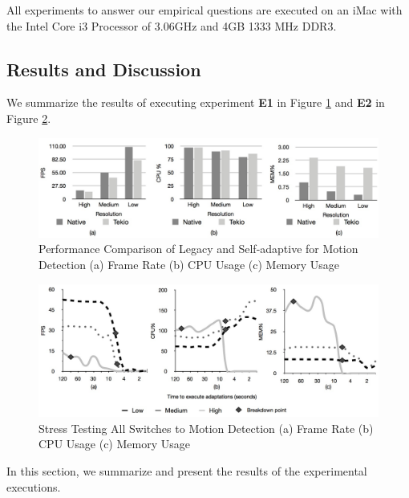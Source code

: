 \documentclass{acm_proc_article-sp}
\begin{document}
All experiments to answer our empirical questions  are executed on an iMac with the Intel Core i3 Processor of 3.06GHz and 4GB 1333 MHz DDR3.
	
\subsection{Results and Discussion}
\label{sec:sec:resultsdiscussion}

We summarize the results of executing experiment \textbf{E1} in Figure \ref{fig:performanceComparison} and  \textbf{E2} in Figure \ref{fig:stressTesting}.
	\begin{figure}
	\centering %
		\includegraphics[scale=0.55]{images/MotionDetectionComparison.jpg} 
		\caption{Performance Comparison of Legacy and Self-adaptive for Motion Detection (a) Frame Rate (b) CPU Usage (c) Memory Usage }
		 \label{fig:performanceComparison} 
	\end{figure}
	
	\begin{figure}
	\centering 
		\includegraphics[scale=0.55]{images/StressTesting.jpg}
		 \caption{Stress Testing All Switches to Motion Detection (a) Frame Rate (b) CPU Usage (c) Memory Usage}
		 \label{fig:stressTesting} 
	\end{figure}


In this section, we summarize and present the results of the experimental executions. 
\end{document}
